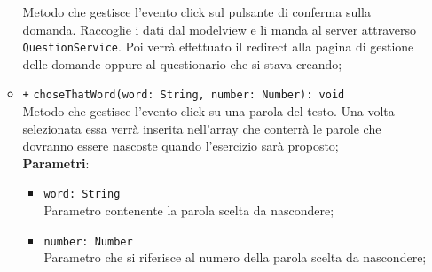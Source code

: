 \begin{itemize}
\begin{itemize}
			Metodo che gestisce l’evento click sul pulsante di conferma sulla domanda. Raccoglie i dati dal modelview e li manda al server attraverso \texttt{QuestionService}. Poi verrà effettuato il redirect alla pagina di gestione delle domande oppure al questionario che si stava creando; 
			\item \texttt{+} \texttt{choseThatWord(word: String, number: Number): void}\\
			Metodo che gestisce l’evento click su una parola del testo. Una volta selezionata essa verrà inserita nell'array che conterrà le parole che dovranno essere nascoste quando l'esercizio sarà proposto; \\
			\textbf{Parametri}:
			\begin{itemize}
				\item \texttt{word: String} \\
				Parametro contenente la parola scelta da nascondere;
				\item \texttt{number: Number} \\ 
				Parametro che si riferisce al numero della parola scelta da nascondere;
			\end{itemize}
	\end{itemize}
\end{itemize}

